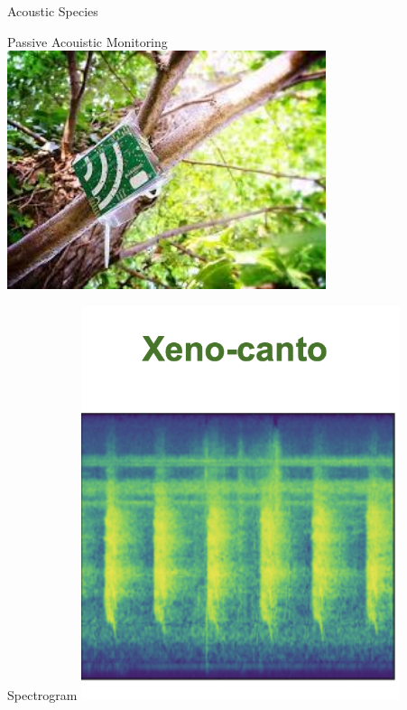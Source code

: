 \begin{frame}{Acoustic Species}
\end{frame}


\begin{frame}{Passive Acouistic Monitoring}
    \centering
    \includegraphics[height=0.7\textheight,width=0.7\textwidth,keepaspectratio]{pam.jpeg}
\end{frame}


\begin{frame}{Spectrogram}
    \centering
    \includegraphics[height=0.7\textheight,width=0.7\textwidth,keepaspectratio]{xeno.png}
\end{frame}


